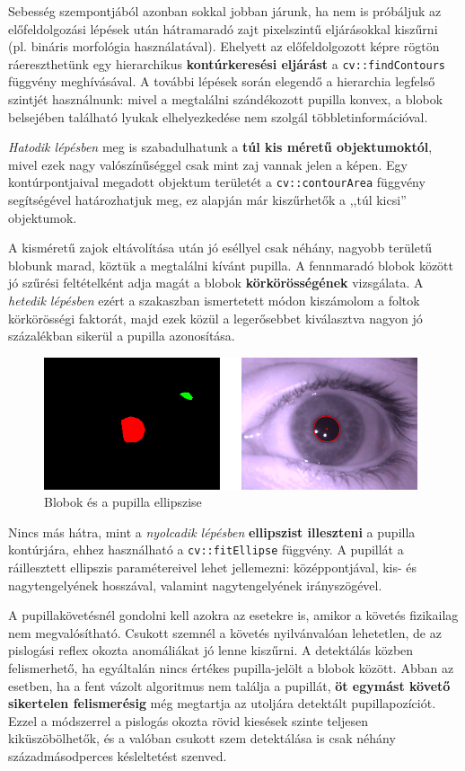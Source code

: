Sebesség szempontjából azonban sokkal jobban járunk, ha nem is próbáljuk az előfeldolgozási lépések után hátramaradó zajt pixelszintű eljárásokkal kiszűrni (pl. bináris morfológia használatával). Ehelyett az előfeldolgozott képre rögtön ráereszthetünk egy hierarchikus \textbf{kontúrkeresési eljárást} a \texttt{cv::findContours} függvény meghívásával. A további lépések során elegendő a hierarchia legfelső szintjét használnunk: mivel a megtalálni szándékozott pupilla konvex, a blobok belsejében található lyukak elhelyezkedése nem szolgál többletinformációval.

\emph{Hatodik lépésben} meg is szabadulhatunk a \textbf{túl kis méretű objektumoktól}, mivel ezek nagy valószínűséggel csak mint zaj vannak jelen a képen. Egy kontúrpontjaival megadott objektum területét a \texttt{cv::contourArea} függvény segítségével határozhatjuk meg, ez alapján már kiszűrhetők a ,,túl kicsi'' objektumok.

A kisméretű zajok eltávolítása után jó eséllyel csak néhány, nagyobb területű blobunk marad, köztük a megtalálni kívánt pupilla. A fennmaradó blobok között jó szűrési feltételként adja magát a blobok \textbf{körkörösségének} vizsgálata. A \emph{hetedik lépésben} ezért a  szakaszban ismertetett módon kiszámolom a foltok körkörösségi faktorát, majd ezek közül a legerősebbet kiválasztva nagyon jó százalékban sikerül a pupilla azonosítása.

\begin{figure}[!ht]
\centering
\includegraphics[width=110mm, keepaspectratio]{figures/blob_pupil.png}
\caption{Blobok és a pupilla ellipszise}
\label{fig:blob_pupil}
\end{figure}

Nincs más hátra, mint a \emph{nyolcadik lépésben} \textbf{ellipszist illeszteni} a pupilla kontúrjára, ehhez használható a \texttt{cv::fitEllipse} függvény. A pupillát a ráillesztett ellipszis paramétereivel lehet jellemezni: középpontjával, kis- és nagytengelyének hosszával, valamint nagytengelyének irányszögével.

\bigskip

A pupillakövetésnél gondolni kell azokra az esetekre is, amikor a követés fizikailag nem megvalósítható. Csukott szemnél a követés nyilvánvalóan lehetetlen, de az pislogási reflex okozta anomáliákat jó lenne kiszűrni. A detektálás közben felismerhető, ha egyáltalán nincs értékes pupilla-jelölt a blobok között. Abban az esetben, ha a fent vázolt algoritmus nem találja a pupillát, \textbf{öt egymást követő sikertelen felismerésig} még megtartja az utoljára detektált pupillapozíciót. Ezzel a módszerrel a pislogás okozta rövid kiesések szinte teljesen kiküszöbölhetők, és a valóban csukott szem detektálása is csak néhány századmásodperces késleltetést szenved.

